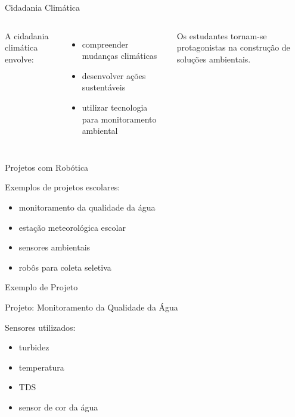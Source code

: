 \documentclass{beamer}
\begin{document}
\begin{frame}{Cidadania Climática}

\begin{columns}


A cidadania climática envolve:

\begin{itemize}
\item compreender mudanças climáticas
\item desenvolver ações sustentáveis
\item utilizar tecnologia para monitoramento ambiental
\end{itemize}

Os estudantes tornam-se protagonistas na construção de soluções ambientais.


\centering
{}

\end{columns}

\end{frame}

\begin{frame}{Projetos com Robótica}

Exemplos de projetos escolares:

\begin{itemize}
\item monitoramento da qualidade da água
\item estação meteorológica escolar
\item sensores ambientais
\item robôs para coleta seletiva
\end{itemize}

\bigskip

\centering
{}

\end{frame}

\begin{frame}{Exemplo de Projeto}

Projeto: Monitoramento da Qualidade da Água

Sensores utilizados:

\begin{itemize}
\item turbidez
\item temperatura
\item TDS
\item sensor de cor da água
\end{itemize}

\bigskip

\centering
{}

\end{frame}
\end{document}
